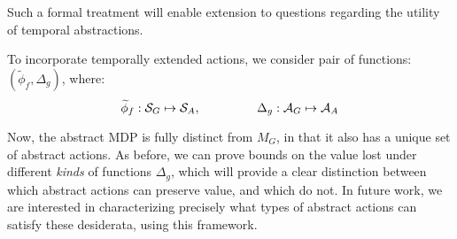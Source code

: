 Such a formal treatment will enable extension to questions regarding the utility of temporal abstractions.

To incorporate temporally extended actions, we consider pair of functions: $(\widetilde{\phi}_f, \Delta_g)$, where:
\begin{equation}
\widetilde{\phi}_f: \mathcal{S}_G \mapsto \mathcal{S}_A, \hspace{16mm} \Delta_g : \mathcal{A}_G \mapsto \mathcal{A}_A
\end{equation}

Now, the abstract MDP is fully distinct from $M_G$, in that it also has a unique set of abstract actions. As before, we can prove bounds on the value lost under different {\it kinds} of functions $\Delta_g$, which will provide a clear distinction between which abstract actions can preserve value, and which do not. In future work, we are interested in characterizing precisely what types of abstract actions can satisfy these desiderata, using this framework.





